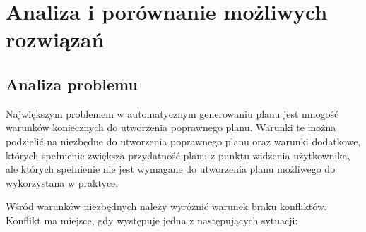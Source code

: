 \chapter{Analiza i porównanie możliwych rozwiązań}
\section{Analiza problemu}
Największym problemem w automatycznym generowaniu planu jest mnogość warunków koniecznych do utworzenia poprawnego planu. Warunki te można podzielić na niezbędne do utworzenia poprawnego planu oraz warunki dodatkowe, których spełnienie zwiększa przydatność planu z punktu widzenia użytkownika, ale których spełnienie nie jest wymagane do utworzenia planu możliwego do wykorzystana w praktyce.

Wśród warunków niezbędnych należy wyróżnić warunek braku konfliktów. Konflikt ma miejsce, gdy występuje jedna z następujących sytuacji:
